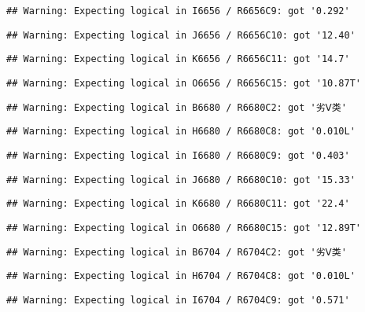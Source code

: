 \documentclass[
]{article}
\begin{document}
\begin{verbatim}
## Warning: Expecting logical in I6656 / R6656C9: got '0.292'
\end{verbatim}

\begin{verbatim}
## Warning: Expecting logical in J6656 / R6656C10: got '12.40'
\end{verbatim}

\begin{verbatim}
## Warning: Expecting logical in K6656 / R6656C11: got '14.7'
\end{verbatim}

\begin{verbatim}
## Warning: Expecting logical in O6656 / R6656C15: got '10.87T'
\end{verbatim}

\begin{verbatim}
## Warning: Expecting logical in B6680 / R6680C2: got '劣Ⅴ类'
\end{verbatim}

\begin{verbatim}
## Warning: Expecting logical in H6680 / R6680C8: got '0.010L'
\end{verbatim}

\begin{verbatim}
## Warning: Expecting logical in I6680 / R6680C9: got '0.403'
\end{verbatim}

\begin{verbatim}
## Warning: Expecting logical in J6680 / R6680C10: got '15.33'
\end{verbatim}

\begin{verbatim}
## Warning: Expecting logical in K6680 / R6680C11: got '22.4'
\end{verbatim}

\begin{verbatim}
## Warning: Expecting logical in O6680 / R6680C15: got '12.89T'
\end{verbatim}

\begin{verbatim}
## Warning: Expecting logical in B6704 / R6704C2: got '劣Ⅴ类'
\end{verbatim}

\begin{verbatim}
## Warning: Expecting logical in H6704 / R6704C8: got '0.010L'
\end{verbatim}

\begin{verbatim}
## Warning: Expecting logical in I6704 / R6704C9: got '0.571'
\end{verbatim}
\end{document}
